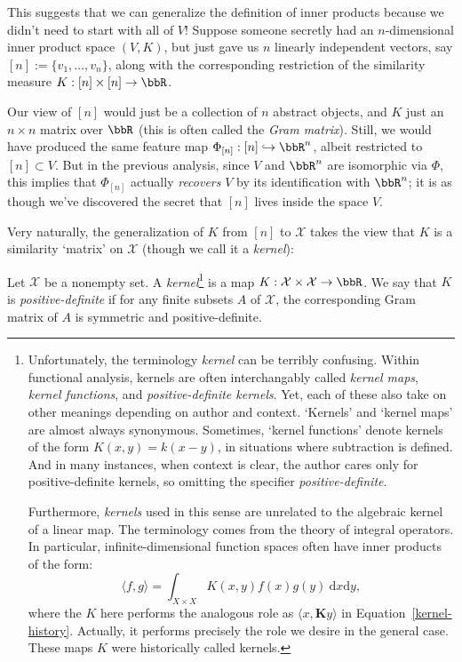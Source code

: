 \documentclass[twoside,11pt]{homework}
\begin{document}
\begin{multicols}{2}
This suggests that we can generalize the definition of inner products because we
didn't need to start with all of $V$! Suppose someone secretly had an $n$-dimensional
inner product space $(V,K)$, but just gave us $n$ linearly independent vectors,
say $[n] := \{v_1,\dotsc, v_n\}$, along with the corresponding restriction of the
similarity measure $K: [n] \times [n] \to \bbR$.

Our view of $[n]$ would just be a collection of $n$ abstract objects, and $K$ just
an $n\times n$ matrix over $\bbR$ (this is often called the \emph{Gram matrix}).
Still, we would have produced the same feature map
$\Phi_{[n]}: [n] \hookrightarrow \bbR^n$, albeit restricted to $[n]\subset V$. But
in the previous analysis, since $V$ and $\bbR^n$ are isomorphic via $\Phi$, this
implies that $\Phi_{[n]}$ actually \emph{recovers} $V$ by its identification with
$\bbR^n$; it is as though we've discovered the secret that $[n]$ lives inside the
space $V$.

Very naturally, the generalization of $K$ from $[n]$ to $\mathcal{X}$ takes the
view that $K$ is a similarity `matrix' on $\mathcal{X}$ (though we call it a
\emph{kernel}):
\begin{definition} Let $\mathcal{X}$ be a nonempty set. A \emph{kernel}\footnote{Unfortunately,
    the terminology \emph{kernel} can be terribly confusing.
    Within functional analysis, kernels are often interchangably called
    \emph{kernel maps}, \emph{kernel functions}, and \emph{positive-definite kernels}.
    Yet, each of these also take on other meanings depending on author and context.
    `Kernels' and `kernel maps' are almost always synonymous. Sometimes, `kernel
    functions' denote kernels of the form $K(x,y) = k(x-y)$, in situations where
    subtraction is defined. And in many instances, when context is clear, the author
    cares only for positive-definite kernels, so omitting the specifier
    \emph{positive-definite}.

    Furthermore, \emph{kernels} used in this sense are unrelated to the algebraic
    kernel of a linear map. The terminology comes from the theory of integral
    operators. In particular, infinite-dimensional function spaces often have inner
    products of the form:
    \[\langle f, g\rangle = \int_{X \times X} K(x,y) f(x) g(y) \ \mathrm{d}x \mathrm{d}y,\]
    where the $K$ here performs the analogous role as $\langle x, \mathbf{K}y\rangle$
    in Equation~\ref{kernel-history}. Actually, it performs precisely the role we
    desire in the general case. These maps $K$ were historically called kernels.
  }
  is a map $K : \mathcal{X} \times \mathcal{X} \to \bbR$. We say that $K$ is
  \emph{positive-definite} if for any finite subsets $A$ of $\mathcal{X}$, the
  corresponding Gram matrix of $A$ is symmetric and positive-definite.
\end{definition}


\end{multicols}
\end{document}
